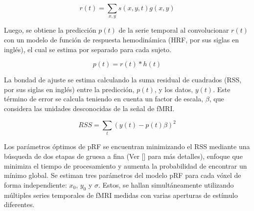 \begin{equation}
	r(t)=\sum_{x,y}s(x,y,t)g(x,y)
\end{equation}

Luego, se obtiene la predicción $p(t)$ de la serie temporal al convolucionar $r(t)$ con un modelo de funci\'on de respuesta hemodin\'amica (HRF, por sus siglas en ingl\'es), el cual se estima por separado para cada sujeto.

\begin{equation}
	p(t) = r(t) * h(t)
\end{equation}

La bondad de ajuste se estima calculando la suma residual de cuadrados (RSS, por sus siglas en ingl\'es) entre la predicción, $p(t)$, y los datos, $y(t)$. Este término de error se calcula teniendo en cuenta un factor de escala, $\beta$, que considera las unidades desconocidas de la señal de fMRI.

\begin{equation}
	RSS = \sum_{t}(y(t)-p(t)\beta)^2
\end{equation}

Los parámetros óptimos de pRF se encuentran minimizando el RSS mediante una búsqueda de dos etapas de gruesa a fina (Ver [\cite{dumoulin_population_2008}] para m\'as detalles), enfoque que minimiza el tiempo de procesamiento y aumenta la probabilidad de encontrar un mínimo global. Se estiman tres parámetros del modelo pRF para cada vóxel de forma independiente: $x_0$, $y_0$ y $\sigma$. Estos, se hallan simultáneamente utilizando múltiples series temporales de fMRI medidas con varias aperturas de estímulo diferentes.

